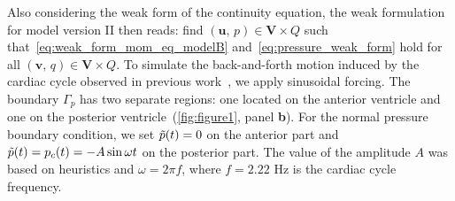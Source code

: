 \documentclass[fleqn]{wlscirep}
\newcommand{\uu}{\mathbf{u}}
\newcommand{\vv}{\mathbf{v}}
\newcommand{\VV}{\mathbf{V}}
\begin{document}
Also considering the weak form of the continuity equation, the weak formulation for model version II then reads: find $(\uu,\, p)\in\VV\times Q$ such that~\eqref{eq:weak_form_mom_eq_modelB} and~\eqref{eq:pressure_weak_form} hold for all $(\vv, \, q)\in\VV\times Q$.
To simulate the back-and-forth motion induced by the cardiac cycle observed in previous work~\cite{Olstad2019CiliaryDevelopment}, we apply sinusoidal forcing. The boundary $\Gamma_p$ has two separate regions: one located on the anterior ventricle and one on the posterior ventricle~(\cref{fig:figure1}, panel \textbf{b}). For the normal pressure boundary condition, we set $\Tilde{p}(t) = 0$ on the anterior part and
$\Tilde{p}(t) = p_c(t) = -A\sin{\omega t}$ on the posterior part. The value of the amplitude $A$ was based on heuristics and $\omega = 2\pi f$, where $f=2.22$ Hz is the cardiac cycle frequency. 
\end{document}
